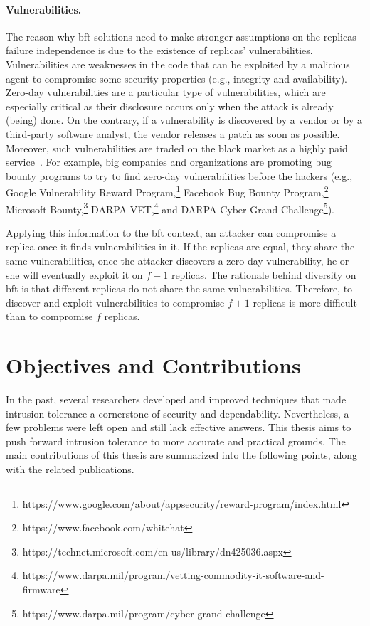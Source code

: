 \paragraph{Vulnerabilities.}
The reason why \gls{bft} solutions need to make stronger assumptions on the replicas failure independence is due to the existence of replicas' vulnerabilities.
Vulnerabilities are weaknesses in the code that can be exploited by a malicious agent to compromise some security properties (e.g., integrity and availability).
Zero-day vulnerabilities are a particular type of vulnerabilities, which are especially critical as their disclosure occurs only when the attack is already (being) done.
On the contrary, if a vulnerability is discovered by a vendor or by a third-party software analyst, the vendor releases a patch as soon as possible. 
Moreover, such vulnerabilities are traded on the black market as a highly paid service~\cite{Symantec:2017,Allodi:2017}.
For example, big companies and organizations are promoting bug bounty programs to try to find zero-day vulnerabilities before the hackers (e.g., Google Vulnerability Reward Program,\footnote{https://www.google.com/about/appsecurity/reward-program/index.html} Facebook Bug Bounty Program,\footnote{https://www.facebook.com/whitehat} Microsoft Bounty,\footnote{https://technet.microsoft.com/en-us/library/dn425036.aspx} DARPA VET,\footnote{https://www.darpa.mil/program/vetting-commodity-it-software-and-firmware} and DARPA Cyber Grand Challenge\footnote{https://www.darpa.mil/program/cyber-grand-challenge}).



Applying this information to the \gls{bft} context, an attacker can compromise a replica once it finds vulnerabilities in it.
If the replicas are equal, they share the same vulnerabilities, once the attacker discovers a zero-day vulnerability, he or she will eventually exploit it on $f+1$ replicas.
The rationale behind diversity on \gls{bft} is that different replicas do not share the same vulnerabilities. 
Therefore, to discover and exploit vulnerabilities to compromise $f+1$ replicas is more difficult than to compromise $f$ replicas.




\section{Objectives and Contributions}

In the past, several researchers developed and improved techniques that made intrusion tolerance a cornerstone of security and dependability.
Nevertheless, a few problems were left open and still lack effective answers.
This thesis aims to push forward intrusion tolerance to more accurate and practical grounds.
The main contributions of this thesis are summarized into the following points, along with the related publications.


